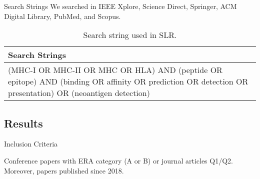 \documentclass[10pt]{beamer}
\newcommand{\1}{
	\setbeamertemplate{background}{
		\texttt{[image: img/1]}
		\tikz[overlay] \fill[fill opacity=0.75,fill=white] (0,0) rectangle (-\paperwidth,\paperheight);
	}
}
\begin{document}
\begin{frame}{Search Strings}{}
	We searched in IEEE Xplore, Science Direct, Springer, ACM Digital Library, PubMed, and Scopus.	
	
	
	\begin{table}[H]
		\begin{center}
			\caption{Search string used in SLR.}
			\label{tab:key_words}
			\setlength{\tabcolsep}{0.5em} %
			{\renewcommand{\arraystretch}{1.4}%
				\begin{tabular}{p{10cm}}
					\textbf{Search Strings} \\ \hline
					(MHC-I OR MHC-II OR MHC OR HLA) AND (peptide OR epitope) AND (binding OR affinity OR prediction OR detection OR presentation) OR (neoantigen detection)                                                                                                      \\		
				\end{tabular}
			}
		\end{center}
	\end{table}
\end{frame}

\subsection{Results}


\begin{frame}{Inclusion Criteria}{}
	
	\begin{block}{}
		Conference papers with ERA category (A or B) or journal articles Q1/Q2. Moreover, papers published since 2018.
	\end{block}
	
\end{frame}
\end{document}
